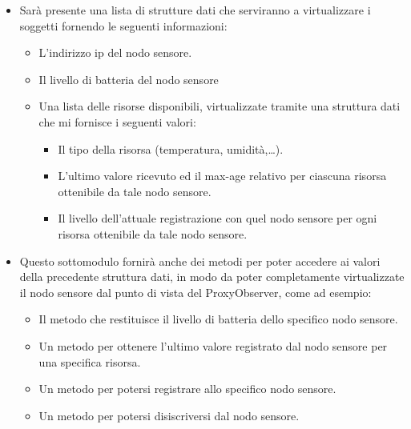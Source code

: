         \begin{itemize}
          \item Sarà presente una lista di strutture dati che serviranno a virtualizzare i soggetti fornendo le seguenti informazioni:

            \begin{itemize}
              \item L’indirizzo ip del nodo sensore.
              \item Il livello di batteria del nodo sensore
              \item Una lista delle risorse disponibili, virtualizzate tramite una struttura dati che mi fornisce i seguenti valori:

                \begin{itemize}
                  \item Il tipo della risorsa (temperatura, umidità,…).
                  \item L’ultimo valore ricevuto ed il max-age relativo per ciascuna risorsa ottenibile da tale nodo sensore.
                  \item Il livello dell’attuale registrazione con quel nodo sensore per ogni risorsa ottenibile da tale nodo sensore.
                \end{itemize}

            \end{itemize}

          \item Questo sottomodulo fornirà anche dei metodi per poter accedere ai valori della precedente struttura dati, in modo da poter completamente virtualizzate il nodo sensore dal punto di vista del ProxyObserver, come ad esempio:

            \begin{itemize}
              \item Il metodo che restituisce il livello di batteria dello specifico nodo sensore.
              \item Un metodo per ottenere l’ultimo valore registrato dal nodo sensore per una specifica risorsa.
              \item Un metodo per potersi registrare allo specifico nodo sensore.
              \item Un metodo per potersi disiscriversi dal nodo sensore.
            \end{itemize}

        \end{itemize}

